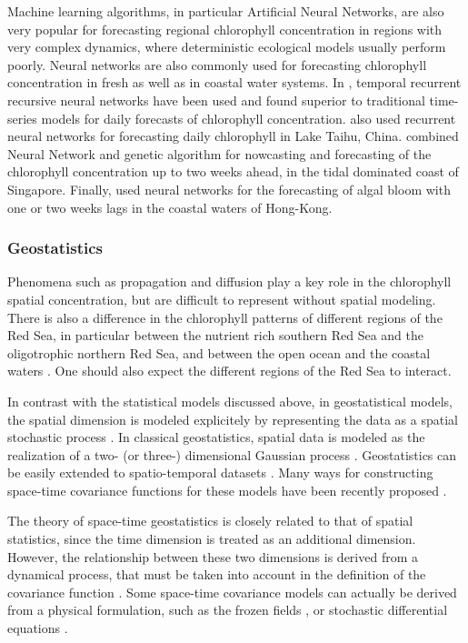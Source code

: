 Machine learning algorithms, in particular Artificial Neural Networks,
are also very popular for forecasting regional chlorophyll concentration in regions
with very complex dynamics, where deterministic ecological models usually
perform poorly. Neural networks are also commonly used for forecasting
chlorophyll concentration in fresh as well as in coastal water systems. In
\citet{Jeong2006}, temporal recurrent recursive neural networks have been used
and found superior to traditional time-series models for daily forecasts of
chlorophyll concentration.  \citet{Wang2013} also used recurrent neural
networks for forecasting daily chlorophyll in Lake Taihu, China.
\citet{Mulia2013} combined Neural Network and genetic algorithm for nowcasting
and forecasting of the chlorophyll concentration up to two weeks ahead, in the
tidal dominated coast of Singapore.  Finally, \citet{Lee2003} used neural
networks for the forecasting of algal bloom with one or two weeks lags in the
coastal waters of Hong-Kong.

\subsubsection{Geostatistics}

Phenomena such as propagation and diffusion play a key role in the chlorophyll
spatial concentration, but are difficult to represent without spatial modeling.
There is also a difference in the chlorophyll patterns of different regions of
the Red Sea, in particular between the nutrient rich southern Red Sea and the
oligotrophic northern Red Sea, and between the open ocean and the coastal
waters \citep{Raitsos2013}.  One should also expect the different regions of
the Red Sea to interact.

In contrast with the statistical models discussed above, in geostatistical
models, the spatial dimension is modeled explicitely by representing the data
as a spatial stochastic process \citep{Gneiting2007}. In classical
geostatistics, spatial data is modeled as the realization of a two- (or three-)
dimensional Gaussian process \citep{Gneiting2007}.  Geostatistics can be easily
extended to spatio-temporal datasets \citep{Gneiting2007}. Many ways for
constructing space-time covariance functions for these models have been
recently proposed \citep{Gneiting2002, Cressie1999, Stein2005}.

The theory of space-time geostatistics is closely related to that of spatial
statistics, since the time dimension is treated as an additional dimension.
However, the relationship between these two dimensions is derived from a
dynamical process, that must be taken into account in the definition of the
covariance function \citep{Gneiting2010}. Some space-time covariance models can
actually be derived from a physical formulation, such as the frozen fields
\citep{Gneiting2010}, or stochastic differential equations \citep{Brown2000,
North2011}.

